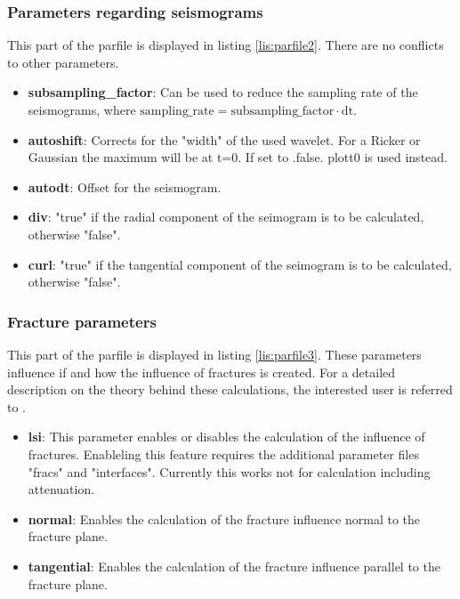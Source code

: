 		\subsubsection{Parameters regarding seismograms}
			This part of the parfile is displayed in listing \ref{lis:parfile2}. There are no conflicts to other parameters.
			 
    		\begin{itemize}
    			\item \textbf{subsampling\_factor}: Can be used to reduce the sampling rate of the seismograms, where $\mathrm{sampling\_rate}=\mathrm{subsampling\_factor} \cdot \mathrm{dt}$.
    			\item \textbf{autoshift}: Corrects for the "width" of the used wavelet. For a Ricker or Gaussian the maximum will be at t=0. If set to .false. plott0 is used instead.
    			\item \textbf{autodt}: Offset for the seismogram.
    			\item \textbf{div}: "true" if the radial component of the seimogram is to be calculated, otherwise "false".
    			\item \textbf{curl}: "true" if the tangential component of the seimogram is to be calculated, otherwise "false".
    		\end{itemize}
    	\subsubsection{Fracture parameters}
			This part of the parfile is displayed in listing \ref{lis:parfile3}. These parameters influence if and how the influence of fractures is created. For a detailed description on the theory behind these calculations, the interested user is referred to \cite{moeller.2018}.
			 
    		\begin{itemize}
    			\item \textbf{lsi}: This parameter enables or disables the calculation of the influence of fractures. Enableling this feature requires the additional parameter files "fracs" and "interfaces". Currently this works not for calculation including attenuation.
    			\item \textbf{normal}: Enables the calculation of the fracture influence normal to the fracture plane.
    			\item \textbf{tangential}: Enables the calculation of the fracture influence parallel to the fracture plane.
    		\end{itemize}
